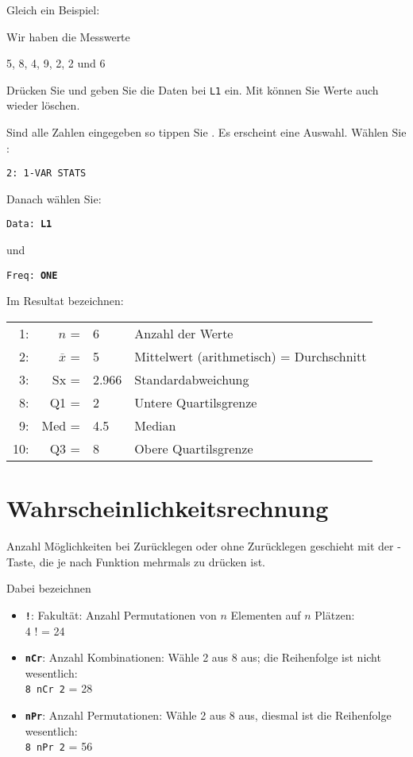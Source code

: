 Gleich ein Beispiel:

Wir haben die Messwerte

5, 8, 4, 9, 2, 2 und 6

Drücken Sie  und geben Sie die Daten
bei \texttt{L1} ein.
Mit  können Sie Werte auch wieder löschen.

Sind alle Zahlen eingegeben so tippen
Sie . Es erscheint eine
Auswahl. Wählen Sie :

\texttt{2: 1-VAR STATS}

Danach wählen Sie:

\texttt{Data: \textbf{L1}}

und

\texttt{Freq: \textbf{ONE}}

Im Resultat bezeichnen:

\begin{tabular}{r|r l|p{9cm}}
 1: & $n$            = & 6     & Anzahl der Werte\\
 2: & $\overline{x}$ = & 5     & Mittelwert (arithmetisch) = Durchschnitt\\
 3: & Sx             = & 2.966 & Standardabweichung \\
 8: & Q1             = & 2     & Untere Quartilsgrenze \\
 9: & Med            = & 4.5   & Median \\
10: & Q3             = & 8     & Obere Quartilsgrenze \\


\end{tabular}
\newpage

\section{Wahrscheinlichkeitsrechnung}\label{wahrscheinlichkeitsrechnung}
Anzahl Möglichkeiten bei Zurücklegen oder ohne Zurücklegen geschieht mit der -Taste, die je nach Funktion mehrmals zu drücken ist. 

Dabei bezeichnen

\begin{itemize}
\item \texttt{\textbf{!}}: Fakultät: Anzahl Permutationen von $n$ Elementen auf $n$ Plätzen:\\
4 ! = 24

\item \texttt{\textbf{nCr}}: Anzahl Kombinationen: Wähle 2 aus 8 aus; die Reihenfolge ist nicht wesentlich:\\
\texttt{8 nCr 2} = 28

\item \texttt{\textbf{nPr}}: Anzahl Permutationen: Wähle 2 aus 8 aus, diesmal ist die Reihenfolge wesentlich:\\
\texttt{8 nPr 2} = 56
\end{itemize}

